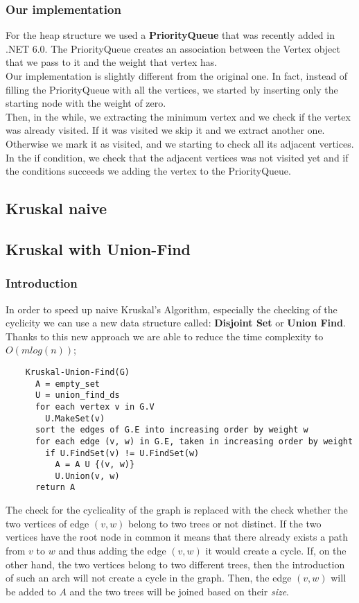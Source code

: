 \subsubsection{Our implementation}
For the heap structure we used a \textbf{PriorityQueue} that was recently added in .NET 6.0.
The PriorityQueue creates an association between the Vertex object that we pass to it and the weight that vertex has.\\
Our implementation is slightly different from the original one. In fact, instead of filling the PriorityQueue with 
all the vertices, we started by inserting only the starting node with the weight of zero.\\
Then, in the while, we extracting the minimum vertex and we check if the vertex was already visited.
If it was visited we skip it and we extract another one.
Otherwise we mark it as visited, and we starting to check all its adjacent vertices.
In the if condition, we check that the adjacent vertices was not visited yet and if the conditions succeeds 
we adding the vertex to the PriorityQueue.

\subsection{Kruskal naive}
\subsection{Kruskal with Union-Find}
\subsubsection{Introduction}
In order to speed up naive Kruskal's Algorithm, especially the checking of the cyclicity we can use a new 
data structure called: \textbf{Disjoint Set} or \textbf{Union Find}.\\
Thanks to this new approach we are able to reduce the time complexity to $O(mlog(n))$;
\begin{verbatim}
    Kruskal-Union-Find(G)
      A = empty_set
      U = union_find_ds
      for each vertex v in G.V
        U.MakeSet(v)
      sort the edges of G.E into increasing order by weight w
      for each edge (v, w) in G.E, taken in increasing order by weight
        if U.FindSet(v) != U.FindSet(w)
          A = A U {(v, w)}
          U.Union(v, w)
      return A
\end{verbatim}

The check for the cyclicality of the graph is replaced with the check whether the two vertices of edge $(v, w)$ 
belong to two trees or not distinct. If the two vertices have the root node in common it means that there already 
exists a path from $v$ to $w$ and thus adding the edge $(v, w)$ it would create a cycle.
If, on the other hand, the two vertices belong to two different trees, then the introduction of such an arch will 
not create a cycle in the graph.
Then, the edge $(v, w)$ will be added to $A$ and the two trees will be joined based on their \textit{size}.

